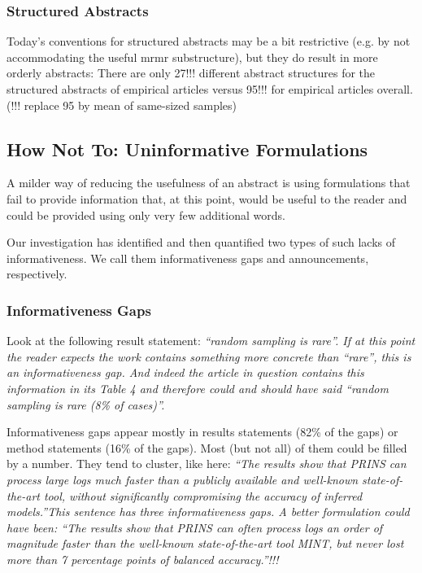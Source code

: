 \documentclass[10pt,journal,compsoc]{IEEEtran}
\newcommand{\Quote}[1]{\bgroup\itshape ``#1''\egroup}  %
\newcommand{\Pseudoquote}[1]{\bgroup\itshape ``#1''\egroup}  %
\begin{document}
\subsubsection{Structured Abstracts}

Today's conventions for structured abstracts may be a bit restrictive
(e.g. by not accommodating the useful mrmr substructure), 
but they do result in more orderly abstracts:
There are only 27!!! different abstract structures for the structured abstracts of empirical articles
versus 95!!! for empirical articles overall.
(!!! replace 95 by mean of same-sized samples)


\subsection{How Not To: Uninformative Formulations}

A milder way of reducing the usefulness of an abstract is using formulations that
fail to provide information that, at this point, would be useful to the reader and 
could be provided using only very few additional words.

Our investigation has identified and then quantified two types
of such lacks of informativeness. 
We call them informativeness gaps and announcements, respectively.

\subsubsection{Informativeness Gaps}

Look at the following result statement:
\Quote{random sampling is rare} [BalRal22]. %
If at this point the reader expects the work contains something more
concrete than \Quote{rare}, this is an informativeness gap.
And indeed the article in question contains this information in its
Table 4 and therefore could and should have said 
\Pseudoquote{random sampling is rare (8\% of cases)}.

Informativeness gaps appear mostly in results statements (82\% of the gaps)
or method statements (16\% of the gaps).
Most (but not all) of them could be filled by a number.
They tend to cluster,
like here:
\Quote{The results show that PRINS can process large logs much faster 
  than a publicly available and well-known state-of-the-art tool, 
  without significantly compromising the accuracy of inferred models.} [ShiBiaBri22] %
This sentence has three informativeness gaps. 
A better formulation could have been:
\Pseudoquote{The results show that PRINS can often process logs an order of magnitude faster 
  than the well-known state-of-the-art tool MINT, 
  but never lost more than 7 percentage points of balanced accuracy.}!!!
\end{document}
